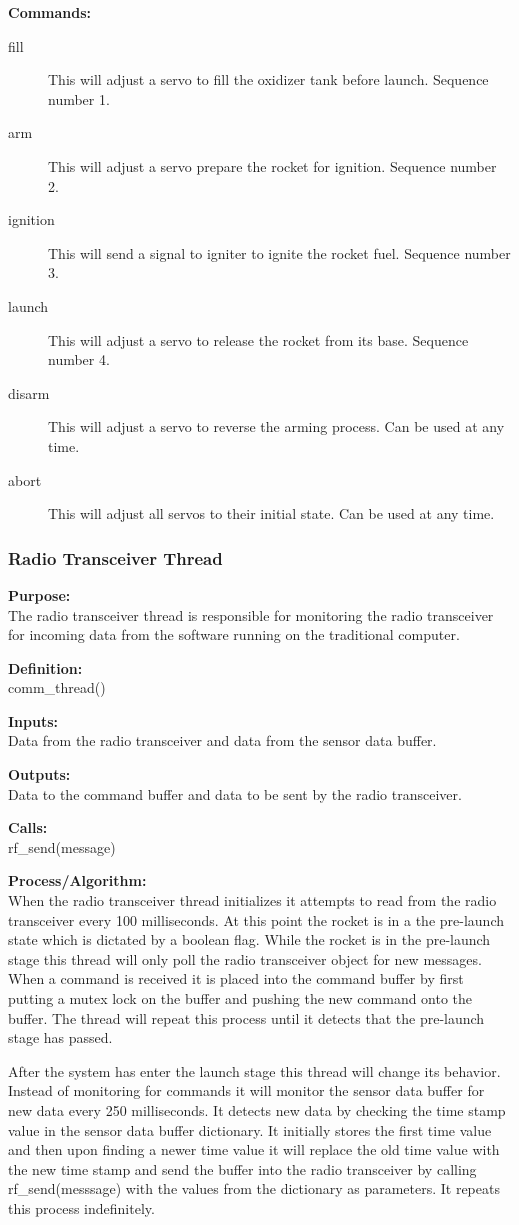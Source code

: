 \documentclass[10pt,draftclsnofoot,onecolumn,compsoc]{IEEEtran}
\begin{document}
{\bf Commands:} \\
\begin{description}
	\item[fill] This will adjust a servo to fill the oxidizer tank before launch. Sequence number 1.
	\item[arm] This will adjust a servo prepare the rocket for ignition. Sequence number 2.
	\item[ignition] This will send a signal to igniter to ignite the rocket fuel. Sequence number 3.
	\item[launch] This will adjust a servo to release the rocket from its base. Sequence number 4.
	\item[disarm] This will adjust a servo to reverse the arming process. Can be used at any time.
	\item[abort] This will adjust all servos to their initial state. Can be used at any time.
\end{description}
\subsubsection{Radio Transceiver Thread}
{\bf Purpose:} \\
The radio transceiver thread is responsible for monitoring the radio transceiver for incoming data from the software running on the traditional computer. \par
{\bf Definition:} \\ 
comm\_thread() \par
{\bf Inputs:} \\  Data from the radio transceiver and data from the sensor data buffer. \par
{\bf Outputs:} \\ Data to the command buffer and data to be sent by the radio transceiver. \par
{\bf Calls:} \\ rf\_send(message) \par
{\bf Process/Algorithm:} \\
When the radio transceiver thread initializes it attempts to read from the radio transceiver every 100 milliseconds. At this point the rocket is in a the pre-launch state which is dictated by a boolean flag. While the rocket is in the pre-launch stage this thread will only poll the radio transceiver object for new messages. When a command is received it is placed into the command buffer by first putting a mutex lock on the buffer and pushing the new command onto the buffer. The thread will repeat this process until it detects that the pre-launch stage has passed.  \par
After the system has enter the launch stage this thread will change its behavior. Instead of monitoring for commands it will monitor the sensor data buffer for new data every 250 milliseconds. It detects new data by checking the time stamp value in the sensor data buffer dictionary. It initially stores the first time value and then upon finding a newer time value it will replace the old time value with the new time stamp and send the buffer into the radio transceiver by calling rf\_send(messsage) with the values from the dictionary as parameters. It repeats this process indefinitely. \par
\end{document}
